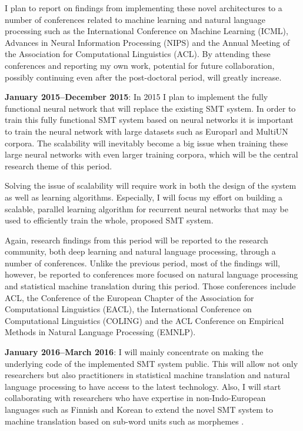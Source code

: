 \documentclass[11pt, oneside]{essay}
\begin{document}
I plan to report on findings from implementing these novel
architectures to a number of conferences related to machine
learning and natural language processing such as the
International Conference on Machine Learning (ICML), Advances in
Neural Information Processing (NIPS) and the Annual Meeting of
the Association for Computational Linguistics (ACL). By attending
these conferences and reporting my own work, potential for future
collaboration, possibly continuing even after the post-doctoral
period, will greatly increase.

\textbf{January 2015--December 2015}: In 2015 I plan to implement the
fully functional neural network that will replace the existing
SMT system. In order to train this fully functional SMT system
based on neural networks it is important to train the neural
network with large datasets such as Europarl \citep{Koehn2005}
and MultiUN \citep{Eisele2010} corpora. The scalability will
inevitably become a big issue when training these large neural
networks with even larger training corpora, which will be the
central research theme of this period.

Solving the issue of scalability will require work in both the
design of the system as well as learning algorithms. Especially,
I will focus my effort on building a scalable, parallel learning
algorithm for recurrent neural networks that may be used to
efficiently train the whole, proposed SMT system. 

Again, research findings from this period will be reported to the
research community, both deep learning and natural language
processing, through a number of conferences. Unlike the previous
period, most of the findings will, however, be reported to
conferences more focused on natural language processing and
statistical machine translation during this period. Those
conferences include ACL, the Conference of the European Chapter
of the Association for Computational Linguistics (EACL), the
International Conference on Computational Linguistics (COLING)
and the ACL Conference on Empirical Methods in Natural Language
Processing (EMNLP). 

\textbf{January 2016--March 2016}: I will mainly concentrate on
making the underlying code of the implemented SMT system public.
This will allow not only researchers but also practitioners in
statistical machine translation and natural language processing
to have access to the latest technology. Also, I will start
collaborating with researchers who have expertise in
non-Indo-European languages such as Finnish and Korean to extend
the novel SMT system to machine translation based on sub-word
units such as morphemes \citep[see, e.g.,][]{Creutz2007}.
\end{document}
